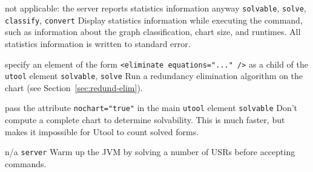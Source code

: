 \begin{itemize}
{not applicable: the server reports statistics information anyway}
{\texttt{solvable}, \texttt{solve}, \texttt{classify}, \texttt{convert}}
{Display statistics information while executing the command, such as
information about the graph classification, chart size, and
runtimes. All statistics information is written to standard error.}


{specify an element of the form \texttt{<eliminate equations="..." />}
as a child of the \texttt{utool} element}
{\texttt{solvable}, \texttt{solve}}
{Run a redundancy elimination algorithm on the chart (see  Section~\ref{sec:redund-elim}).} 

{pass the attribute \texttt{nochart="true"} in the main \texttt{utool} element}
{\texttt{solvable}}
{Don't compute a complete chart to determine solvability. This is much faster, but makes it impossible for Utool to count solved forms.}


{n/a}
{\texttt{server}}
{Warm up the JVM by solving a number of USRs before accepting commands.}




\end{itemize}




